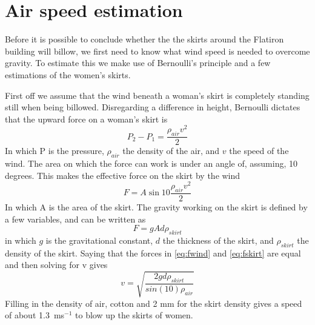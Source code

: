 \clearpage\appendix
\section{Air speed estimation}
\label{airspeedestimation}
Before it is possible to conclude whether the the skirts around the Flatiron building will billow, we first need to know what wind speed is needed to overcome gravity. To estimate this we make use of Bernoulli's principle and a few estimations of the women's skirts.

First off we assume that the wind beneath a woman's skirt is completely standing still when being billowed. Disregarding a difference in height, Bernoulli dictates that the upward force on a woman's skirt is
\begin{equation}
P_2 - P_1 = \frac{\rho_{air}v^2}{2}
\end{equation}
In which P is the pressure, $\rho_{air}$ the density of the air, and $v$ the speed of the wind. The area on which the force can work is under an angle of, assuming, 10 degrees. This makes the effective force on the skirt by the wind
\begin{equation}
F = A \sin{10} \frac{\rho_{air}v^2}{2}
\label{eq:fwind}
\end{equation}
In which A is the area of the skirt. The gravity working on the skirt is defined by a few variables, and can be written as
\begin{equation}
F = g A d \rho_{skirt}
\label{eq:fskirt}
\end{equation}
in which $g$ is the gravitational constant, $d$ the thickness of the skirt, and $\rho_{skirt}$ the density of the skirt. Saying that the forces in \autoref{eq:fwind} and \autoref{eq:fskirt} are equal and then solving for v gives
\begin{equation}
v = \sqrt{\frac{2 g d \rho_{skirt}}{sin(10) \rho_{air}}}
\end{equation}
Filling in the density of air, cotton and 2 mm for the skirt density gives a speed of about 1.3~ms$^{-1}$ to blow up the skirts of women.

